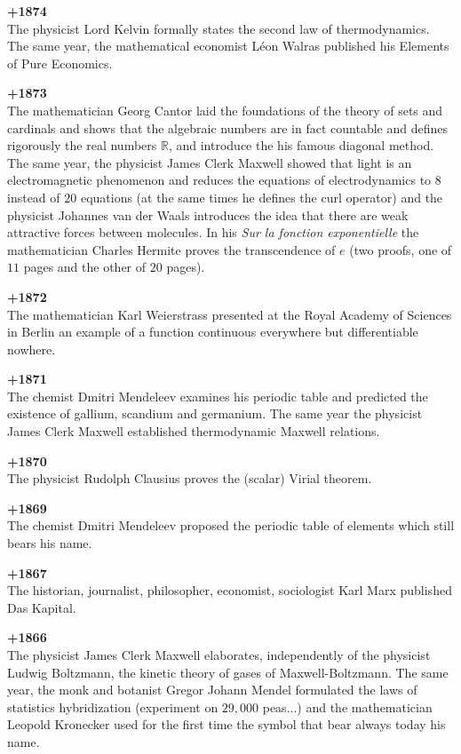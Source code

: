 \textbf{+1874}\\
The physicist Lord Kelvin formally states the second law of thermodynamics. The same year, the mathematical economist Léon Walras published his Elements of Pure Economics.

\textbf{+1873}\\
The mathematician Georg Cantor laid the foundations of the theory of sets and cardinals and shows that the algebraic numbers are in fact countable and defines rigorously the real numbers $\mathbb{R}$, and introduce the his famous diagonal method. The same year, the physicist James Clerk Maxwell showed that light is an electromagnetic phenomenon and reduces the equations of electrodynamics to $8$ instead of $20$ equations (at the same times he defines the curl operator) and the physicist Johannes van der Waals introduces the idea that there are weak attractive forces between molecules. In his \textit{Sur la fonction exponentielle} the mathematician Charles Hermite proves the transcendence of $e$ (two proofs, one of $11$ pages and the other of $20$ pages).

\textbf{+1872}\\
The mathematician Karl Weierstrass presented at the Royal Academy of Sciences in Berlin an example of a function continuous everywhere but differentiable nowhere.

\textbf{+1871}\\
The chemist Dmitri Mendeleev examines his periodic table and predicted the existence of gallium, scandium and germanium. The same year the physicist James Clerk Maxwell established thermodynamic Maxwell relations. 

\textbf{+1870}\\
The physicist Rudolph Clausius proves the (scalar) Virial theorem.

\textbf{+1869}\\
The chemist Dmitri Mendeleev proposed the periodic table of elements which still bears his name.

\textbf{+1867}\\
The historian, journalist, philosopher, economist, sociologist Karl Marx published Das Kapital. 

\textbf{+1866}\\
The physicist James Clerk Maxwell elaborates, independently of the physicist Ludwig Boltzmann, the kinetic theory of gases of Maxwell-Boltzmann. The same year, the monk and botanist Gregor Johann Mendel formulated the laws of statistics hybridization (experiment on $29,000$ peas...) and the mathematician Leopold Kronecker used for the first time the symbol that bear always today his name.

